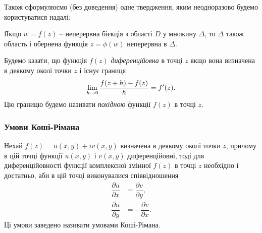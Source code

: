 Також сформулюємо (без доведення) одне твердження, яким неодноразово будемо користуватися надалі:

\begin{theorem}
	Якщо $w = f(z)$ -- неперервна бієкція з області $D$ у множину $\Delta$, то $\Delta$ також область і обернена функція $z = \phi(w)$ неперервна в $\Delta$.
\end{theorem}

Будемо казати, що функція $f(z)$ \textit{диференційовна} в точці $z$ якщо вона визначена в деякому околі точки $z$ і існує границя
\begin{equation}
	\label{eq:2.2.12}
	\displaystyle\lim\limits_{h \to 0} \dfrac{f(z + h) - f(z)}{h} = f'(z).
\end{equation}
Цю границю будемо називати \textit{похідною} функції $f(z)$ в точці $z$.

\subsubsection{Умови Коші-Рімана}

\begin{theorem}
	Нехай $f(z) = u(x,y) + i v(x,y)$ визначена в деякому околі точки $z$, причому в цій точці функції $u(x, y)$ і $v(x, y)$ диференційовні, тоді для диференційовності функції комплексної змінної $f(z)$ в точці $z$ необхідно і достатньо, аби в цій точці виконувалися співвідношення
	\begin{align}
		\label{eq:2.2.13}
		\dfrac{\partial u}{\partial x} &= \dfrac{\partial v}{\partial y}, \\
		\label{eq:2.2.14}
		\dfrac{\partial u}{\partial y} &= - \dfrac{\partial v}{\partial x}.
	\end{align}
	Ці умови заведено називати умовами Коші-Рімана.
\end{theorem}

